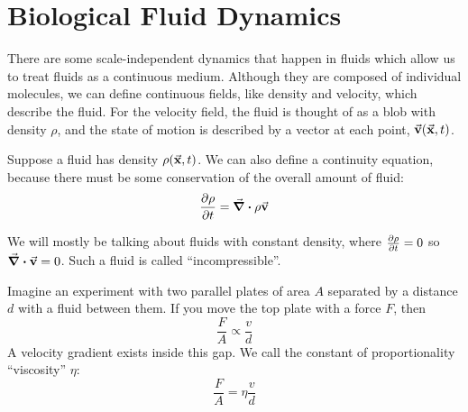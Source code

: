 \documentclass[a4paper,twoside,master.tex]{subfiles}
\begin{document}
\chapter{Biological Fluid Dynamics}

There are some scale-independent dynamics that happen in fluids which allow us to treat fluids as a continuous medium. Although they are composed of individual molecules, we can define continuous fields, like density and velocity, which describe the fluid. For the velocity field, the fluid is thought of as a blob with density $ \rho $, and the state of motion is described by a vector at each point, $ \va{v}(\va{x}, t) $.

Suppose a fluid has density $ \rho(\va{x}, t) $. We can also define a continuity equation, because there must be some conservation of the overall amount of fluid:
\begin{equation}
    \pdv{\rho}{t} = \div{\rho \va{v}}
\end{equation}

We will mostly be talking about fluids with constant density, where $ \pdv{\rho}{t} = 0 $ so $ \div{\va{v}} = 0 $. Such a fluid is called ``incompressible''.

Imagine an experiment with two parallel plates of area $ A $ separated by a distance $ d $ with a fluid between them. If you move the top plate with a force $ F $, then
\begin{equation}
    \frac{F}{A} \propto \frac{v}{d}
\end{equation}
A velocity gradient exists inside this gap. We call the constant of proportionality ``viscosity'' $ \eta $: 
\begin{equation}
    \frac{F}{A} = \eta \frac{v}{d}
\end{equation}
\end{document}
